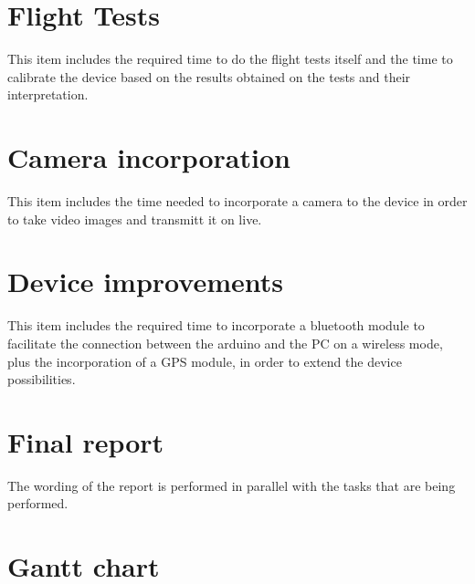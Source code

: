 \documentclass[12pt, a4paper,twoside]{tesi_upf}
\begin{document}
\section{Flight Tests}

This item includes the required time to do the flight tests itself and the time to calibrate the device based on the results obtained on the tests and their interpretation.

\section{Camera incorporation}

This item includes the time needed to incorporate a camera to the device in order to take video images and transmitt it on live.

\section{Device improvements}

This item includes the required time to incorporate a bluetooth module to facilitate the connection between the arduino and the PC on a wireless mode, plus the incorporation of a GPS module, in order to extend the device possibilities.

\section{Final report}

The wording of the report is performed in parallel with the tasks that are being performed.

\section{Gantt chart}
\end{document}
